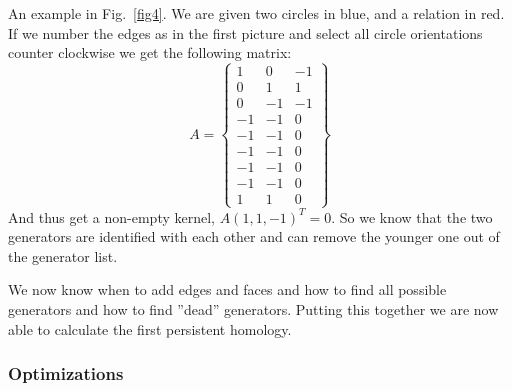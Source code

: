 \documentclass[11pt, a4paper, UKenglish]{article}
\begin{document}
    An example in Fig.~\ref{fig4}.
    We are given two circles in blue, and a relation in red.
    If we number the edges as in the first picture and select all circle orientations counter clockwise we get the following matrix:
    \[A=\begin{Bmatrix}
            1 & 0 & -1\\
            0 & 1 & 1\\
            0 & -1 & -1\\
            -1 & -1 & 0\\
            -1 & -1 & 0\\
            -1 & -1 & 0\\
            -1 & -1 & 0\\
            -1 & -1 & 0\\
            1 & 1 & 0
    \end{Bmatrix}\]
    And thus get a non-empty kernel, $A(1,1,-1)^T=0$.
    So we know that the two generators are identified with each other and can remove the younger one out of the generator list.

    We now know when to add edges and faces and how to find all possible generators and how to find ''dead'' generators.
    Putting this together we are now able to calculate the first persistent homology.

    \subsubsection{Optimizations}\label{subsec:optimizations}
\end{document}
